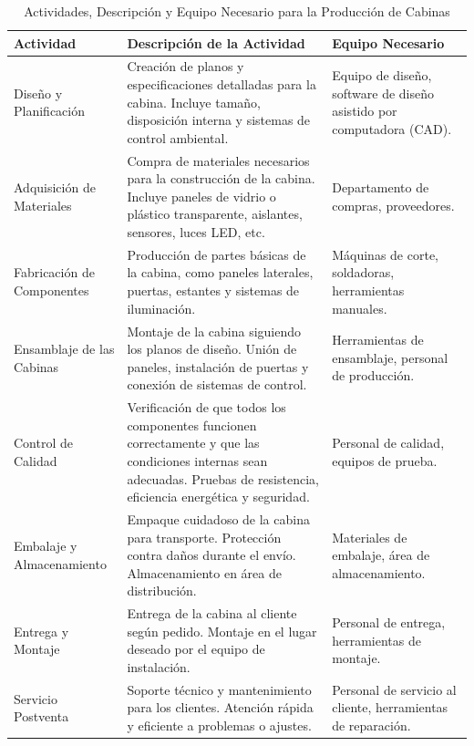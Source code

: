 \begin{table}[H]
    \centering
    \caption{Actividades, Descripción y Equipo Necesario para la Producción de Cabinas}
    \begin{tabular}{|l|p{}|p{}|}
        \hline
        \textbf{Actividad} & \textbf{Descripción de la Actividad} & \textbf{Equipo Necesario} \\
        \hline
        Diseño y Planificación & Creación de planos y especificaciones detalladas para la cabina. Incluye tamaño, disposición interna y sistemas de control ambiental. & Equipo de diseño, software de diseño asistido por computadora (CAD). \\
        \hline
        Adquisición de Materiales & Compra de materiales necesarios para la construcción de la cabina. Incluye paneles de vidrio o plástico transparente, aislantes, sensores, luces LED, etc. & Departamento de compras, proveedores. \\
        \hline
        Fabricación de Componentes & Producción de partes básicas de la cabina, como paneles laterales, puertas, estantes y sistemas de iluminación. & Máquinas de corte, soldadoras, herramientas manuales. \\
        \hline
        Ensamblaje de las Cabinas & Montaje de la cabina siguiendo los planos de diseño. Unión de paneles, instalación de puertas y conexión de sistemas de control. & Herramientas de ensamblaje, personal de producción. \\
        \hline
        Control de Calidad & Verificación de que todos los componentes funcionen correctamente y que las condiciones internas sean adecuadas. Pruebas de resistencia, eficiencia energética y seguridad. & Personal de calidad, equipos de prueba. \\
        \hline
        Embalaje y Almacenamiento & Empaque cuidadoso de la cabina para transporte. Protección contra daños durante el envío. Almacenamiento en área de distribución. & Materiales de embalaje, área de almacenamiento. \\
        \hline
        Entrega y Montaje & Entrega de la cabina al cliente según pedido. Montaje en el lugar deseado por el equipo de instalación. & Personal de entrega, herramientas de montaje. \\
        \hline
        Servicio Postventa & Soporte técnico y mantenimiento para los clientes. Atención rápida y eficiente a problemas o ajustes. & Personal de servicio al cliente, herramientas de reparación. \\
        \hline
    \end{tabular}
\end{table}


